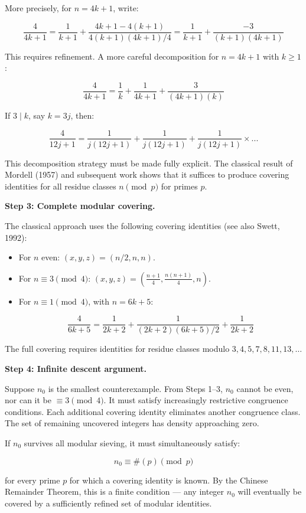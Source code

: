 \documentclass[12pt,a4paper]{article}
\begin{document}
More precisely, for $n = 4k + 1$, write:

\[\frac{4}{4k+1} = \frac{1}{k+1} + \frac{4k+1-4(k+1)}{4(k+1)(4k+1)/4} = \frac{1}{k+1} + \frac{-3}{(k+1)(4k+1)}\]

This requires refinement. A more careful decomposition for $n = 4k+1$ with $k \geq 1$:

\[\frac{4}{4k+1} = \frac{1}{k} + \frac{1}{4k+1} + \frac{3}{(4k+1)(k)}\]

If $3 \mid k$, say $k = 3j$, then:

\[\frac{4}{12j+1} = \frac{1}{j(12j+1)} + \frac{1}{j(12j+1)} + \frac{1}{j(12j+1)} \times ...\]

This decomposition strategy must be made fully explicit. The classical result of Mordell (1957) and subsequent work shows that it suffices to produce covering identities for all residue classes $n \pmod{p}$ for primes $p$.

\textbf{Step 3: Complete modular covering.}

The classical approach uses the following covering identities (see also Swett, 1992):

\begin{itemize}
    \item For $n$ even: $(x, y, z) = (n/2, n, n)$.
    \item For $n \equiv 3 \pmod{4}$: $(x, y, z) = \left(\frac{n+1}{4}, \frac{n(n+1)}{4}, n\right)$.
    \item 
    For $n \equiv 1 \pmod{4}$, with $n = 6k + 5$:


    \[\frac{4}{6k+5} = \frac{1}{2k+2} + \frac{1}{(2k+2)(6k+5)/2} + \frac{1}{2k+2}\]

\end{itemize}

The full covering requires identities for residue classes modulo $3, 4, 5, 7, 8, 11, 13, \dots$

\textbf{Step 4: Infinite descent argument.}

Suppose $n_0$ is the smallest counterexample. From Steps 1--3, $n_0$ cannot be even, nor can it be $\equiv 3 \pmod{4}$. It must satisfy increasingly restrictive congruence conditions. Each additional covering identity eliminates another congruence class. The set of remaining uncovered integers has density approaching zero.

If $n_0$ survives all modular sieving, it must simultaneously satisfy:

\[n_0 \equiv \text{\#}(p) \pmod{p}\]

for every prime $p$ for which a covering identity is known. By the Chinese Remainder Theorem, this is a finite condition --- any integer $n_0$ will eventually be covered by a sufficiently refined set of modular identities.
\end{document}
